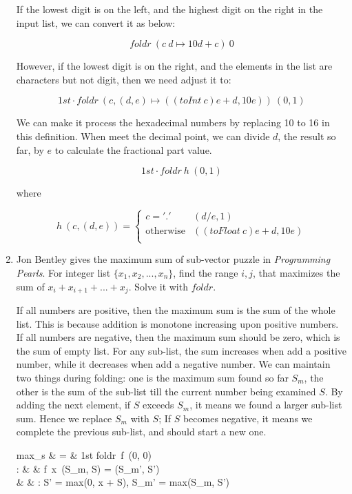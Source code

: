 \documentclass[UTF8]{article}
\begin{document}
\begin{enumerate}
If the lowest digit is on the left, and the highest digit on the right in the input list, we can convert it as below:

\[
foldr\ (c\ d \mapsto 10d + c)\ 0
\]

However, if the lowest digit is on the right, and the elements in the list are characters but not digit, then we need adjust it to:

\[
1st \cdot foldr\ (c, (d, e) \mapsto ((toInt\ c)e + d, 10e))\ (0, 1)
\]

We can make it process the hexadecimal numbers by replacing 10 to 16 in this definition. When meet the decimal point, we can divide $d$, the result so far, by $e$ to calculate the fractional part value.

\[
1st \cdot foldr\ h\ (0, 1)
\]

where

\[
h\ (c, (d, e)) = \begin{cases}
c = '.' & (d / e, 1) \\
\text{otherwise} & ((toFloat\ c)e + d, 10e) \\
\end{cases}
\]

\item Jon Bentley gives the maximum sum of sub-vector puzzle in {\em Programming Pearls}. For integer list $\{x_1, x_2, ..., x_n\}$, find the range $i, j$, that maximizes the sum of $x_i + x_{i+1} + ... + x_j$. Solve it with $foldr$.

If all numbers are positive, then the maximum sum is the sum of the whole list. This is because addition is monotone increasing upon positive numbers. If all numbers are negative, then the maximum sum should be zero, which is the sum of empty list. For any sub-list, the sum increases when add a positive number, while it decreases when add a negative number. We can maintain two things during folding: one is the maximum sum found so far $S_m$, the other is the sum of the sub-list till the current number being examined $S$. By adding the next element, if $S$ exceeds $S_m$, it means we found a larger sub-list sum. Hence we replace $S_m$ with $S$; If $S$ becomes negative, it means we complete the previous sub-list, and should start a new one.

\blre
max_s & = & 1st \cdot foldr\ f\ (0, 0) \\
: & & f\ x\ (S_m, S) = (S_m', S') \\
& & :  S' = max(0, x + S), S_m' = max(S_m, S') \\
\elre


\end{enumerate}
\end{document}
